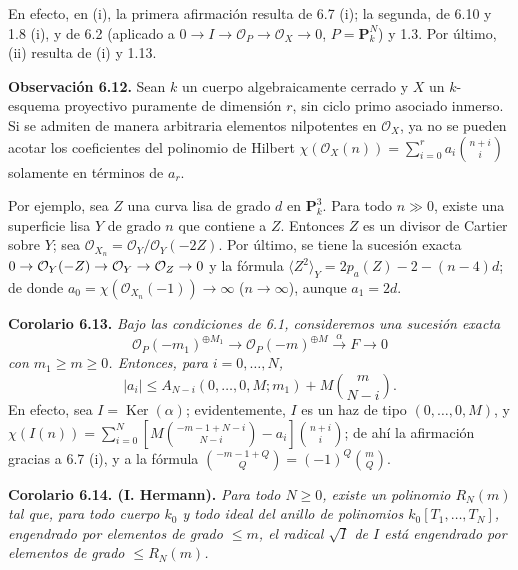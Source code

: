 En efecto, en (i), la primera afirmación resulta de 6.7 (i); la segunda, de 6.10 y 1.8 (i), y de 6.2 (aplicado a $0\to I\to\mathcal O_P\to\mathcal O_X\to0$, $P=\mathbf P^N_k$) y 1.3. Por último, (ii) resulta de (i) y 1.13.

\textbf{Observación 6.12.} Sean $k$ un cuerpo algebraicamente cerrado y $X$ un $k$-esquema proyectivo puramente de dimensión $r$, sin ciclo primo asociado inmerso. Si se admiten de manera arbitraria elementos nilpotentes en $\mathcal O_X$, ya no se pueden acotar los coeficientes del polinomio de Hilbert $\chi(\mathcal O_X(n))=\sum_{i=0}^{r}a_i\binom{n+i}{i}$ solamente en términos de $a_r$.

Por ejemplo, sea $Z$ una curva lisa de grado $d$ en $\mathbf P^3_k$. Para todo $n\gg0$, existe una superficie lisa $Y$ de grado $n$ que contiene a $Z$. Entonces $Z$ es un divisor de Cartier sobre $Y$; sea $\mathcal O_{X_n}=\mathcal O_Y/\mathcal O_Y(-2Z)$. Por último, se tiene la sucesión exacta $0\to\sisi{\mathcal O_X}{\mathcal O_Y}(-Z)\to\sisi{\mathcal O_X}{\mathcal O_Y}\to\mathcal O_Z\to0$ y la fórmula $\langle Z^2\rangle_Y=2p_a(Z)-2-(n-4)d$; de donde $a_0=\chi(\mathcal O_{X_n}(-1))\to\infty$ ($n\to\infty$), aunque $a_1=2d$. %

\textbf{Corolario 6.13.} \emph{Bajo las condiciones de 6.1, consideremos una sucesión exacta}
\[
   \mathcal O_P(-m_1)^{\oplus M_1}\longrightarrow
   \mathcal O_P(-m)^{\oplus M}\xrightarrow{\alpha}F\longrightarrow0
\]
\emph{con $m_1\ge m\ge0$. Entonces, para $i=0,\ldots,N$,}
\[
   |a_i|\le A_{N-i}(0,\ldots,0,M;m_1)+M\binom{m}{N-i}.
\]
En efecto, sea $I=\operatorname{Ker}(\alpha)$; evidentemente, $I$ es un haz de tipo $(0,\ldots,0,M)$, y $\chi(I(n))=\sum_{i=0}^{N}\left[M\binom{-m-1+N-i}{N-i}-a_i\right]\binom{n+i}{i}$; de ahí la afirmación gracias a 6.7 (i), y a la fórmula $\binom{-m-1+Q}{Q}=(-1)^Q\binom{m}{Q}$.

\textbf{Corolario 6.14. (I. Hermann).} \emph{Para todo $N\ge0$, existe un polinomio $R_N(m)$ tal que, para todo cuerpo $k_0$ y todo ideal del anillo de polinomios $k_0[T_1,\ldots,T_N]$, engendrado por elementos de grado $\le m$, el radical $\sqrt I$ de $I$ está engendrado por elementos de grado $\le R_N(m)$.}

